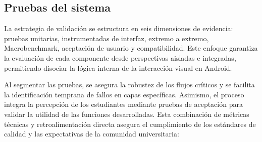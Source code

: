\subsection{Pruebas del sistema}
La estrategia de validación se estructura en seis dimensiones de evidencia: pruebas unitarias, instrumentadas de interfaz, extremo a extremo, Macrobenchmark, aceptación de usuario y compatibilidad. Este enfoque garantiza la evaluación de cada componente desde perspectivas aisladas e integradas, permitiendo disociar la lógica interna de la interacción visual en Android.

Al segmentar las pruebas, se asegura la robustez de los flujos críticos y se facilita la identificación temprana de fallos en capas específicas. Asimismo, el proceso integra la percepción de los estudiantes mediante pruebas de aceptación para validar la utilidad de las funciones desarrolladas. Esta combinación de métricas técnicas y retroalimentación directa asegura el cumplimiento de los estándares de calidad y las expectativas de la comunidad universitaria:

